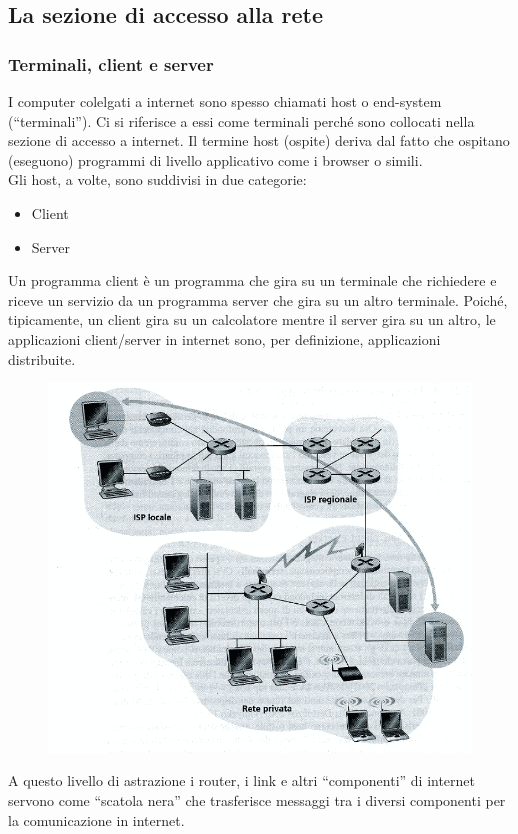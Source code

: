 \documentclass[11pt,a4paper]{article}
\begin{document}
\subsection{La sezione di accesso alla rete}
\subsubsection{Terminali, client e server}
I computer colelgati a internet sono spesso chiamati host o end-system (“terminali”). Ci si riferisce a essi come terminali perché sono collocati nella sezione di accesso a internet. Il termine host (ospite) deriva dal fatto che ospitano (eseguono) programmi di livello applicativo come i browser o simili. \\
Gli host, a volte, sono suddivisi in due categorie:
\begin{itemize}
	\item Client
	\item Server
\end{itemize}
Un programma client è un programma che gira su un terminale che richiedere e riceve un servizio da un programma server che gira su un altro terminale.
Poiché, tipicamente, un client gira su un calcolatore mentre il server gira su un altro, le applicazioni client/server in internet sono, per definizione, applicazioni distribuite.
\begin{figure}
	\begin{center}
		\includegraphics[scale=0.6]{img/001.png}
	\end{center}
\end{figure}
A questo livello di astrazione i router, i link e altri “componenti” di internet servono come “scatola nera” che trasferisce messaggi tra i diversi componenti per la comunicazione in internet.
\end{document}
